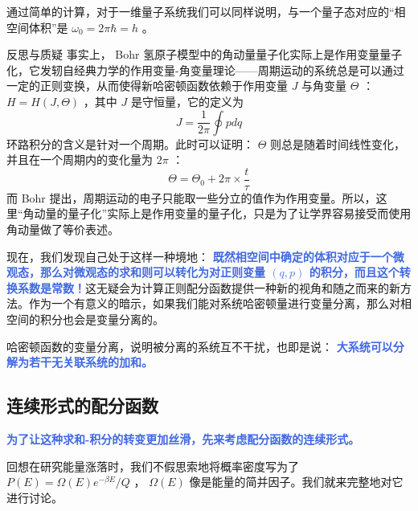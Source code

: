 通过简单的计算，对于一维量子系统我们可以同样说明，与一个量子态对应的“相空间体积”是 $\omega_0 = 2\pi \hbar = h$ 。

\begin{justification}{\kaishu 反思与质疑}
\kaishu \fontsize{11pt}{16pt}
\quad\quad 事实上， Bohr 氢原子模型中的角动量量子化实际上是作用变量量子化，它发轫自经典力学的作用变量-角变量理论——周期运动的系统总是可以通过一定的正则变换，从而使得新哈密顿函数依赖于作用变量 $J$ 与角变量 $\Theta$ ：$H = H(J,\Theta)$ ，其中 $J$ 是守恒量，它的定义为
\[
    J = \frac{1}{2\pi} \oint pdq
\]
环路积分的含义是针对一个周期。此时可以证明： $\Theta$ 则总是随着时间线性变化，并且在一个周期内的变化量为 $2\pi$ ：
\[
    \Theta = \Theta_0 + 2\pi \times \frac{t}{\tau} 
\]
而 Bohr 提出，周期运动的电子只能取一些分立的值作为作用变量。所以，这里“角动量的量子化”实际上是作用变量的量子化，只是为了让学界容易接受而使用角动量做了等价表述。
\end{justification}



现在，我们发现自己处于这样一种境地： \textcolor{RoyalBlue}{\textbf{\kaishu 既然相空间中确定的体积对应于一个微观态，那么对微观态的求和则可以转化为对正则变量 $(q,p)$ 的积分，而且这个转换系数是常数！}}这无疑会为计算正则配分函数提供一种新的视角和随之而来的新方法。作为一个有意义的暗示，如果我们能对系统哈密顿量进行变量分离，那么对相空间的积分也会是变量分离的。

哈密顿函数的变量分离，说明被分离的系统互不干扰，也即是说： \textcolor{RoyalBlue}{\textbf{\kaishu 大系统可以分解为若干无关联系统的加和。}} 

\subsection{连续形式的配分函数}
\textcolor{RoyalBlue}{\textbf{\kaishu 为了让这种求和-积分的转变更加丝滑，先来考虑配分函数的连续形式。}}

回想在研究能量涨落时，我们不假思索地将概率密度写为了 $P(E) = \Omega(E)e^{-\beta E}/Q$ ， $\Omega(E)$ 像是能量的简并因子。我们就来完整地对它进行讨论。

